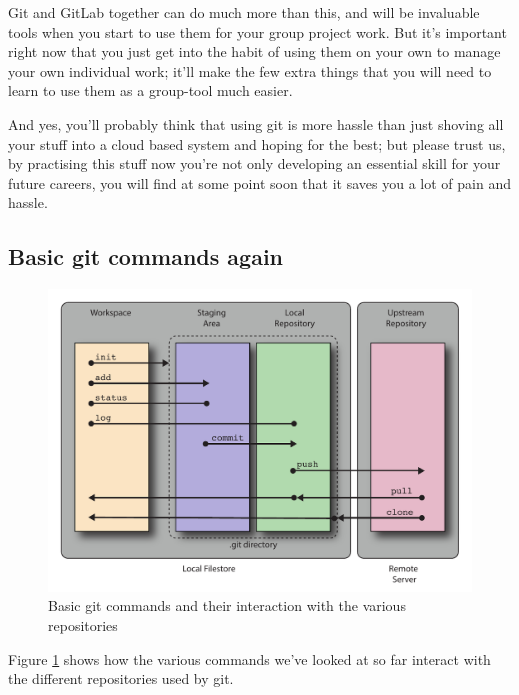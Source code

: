 Git and GitLab together can do much more than this, and will be invaluable tools when you start to use them for your group project work. But it's important right now that you just get into the habit of using them on your own to manage your own individual work; it'll make the few extra things that you will need to learn to use them as a group-tool much easier.

And yes, you'll probably think that using git is more hassle than just shoving all your stuff into a cloud based system and hoping for the best; but please trust us, by practising this stuff now you're not only developing an essential skill for your future careers, you will find at some point soon that it saves you a lot of pain and hassle. 


\subsection{Basic git commands again}

\begin{figure}
\centerline{\includegraphics[width=15cm]{images/git-commands}}
\caption{Basic git commands and their interaction with the various repositories}\label{figure:git-commands}
\end{figure}

Figure \ref{figure:git-commands} shows how the various commands we've looked at so far interact with the different repositories used by git. 

